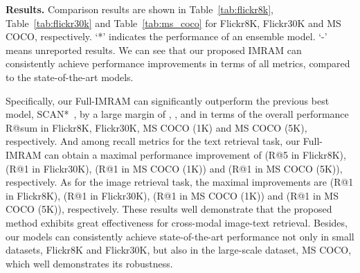 \documentclass[10pt,twocolumn,letterpaper]{article}
\begin{document}
\textbf{Results.} Comparison results are shown in Table~\ref{tab:flickr8k}, Table~\ref{tab:flickr30k} and Table~\ref{tab:ms_coco} for Flickr8K, Flickr30K and MS COCO, respectively. `*' indicates the performance of an ensemble model. `-' means unreported results. We can see that our proposed IMRAM can consistently achieve performance improvements in terms of all metrics, compared to the state-of-the-art models. 

Specifically, our Full-IMRAM can significantly outperform the previous best model, \ie{} SCAN*~\cite{lee2018stacked}, by a large margin of , ,  and  in terms of the overall performance R@sum in Flickr8K, Flickr30K, MS COCO (1K) and MS COCO (5K), respectively. And among recall metrics for the text retrieval task, our Full-IMRAM can obtain a maximal performance improvement of  (R@5 in Flickr8K),  (R@1 in Flickr30K),  (R@1 in MS COCO (1K)) and  (R@1 in MS COCO (5K)), respectively. As for the image retrieval task, the maximal improvements are  (R@1 in Flickr8K),  (R@1 in Flickr30K),  (R@1 in MS COCO (1K)) and  (R@1 in MS COCO (5K)), respectively. These results well demonstrate that the proposed method exhibits great effectiveness for cross-modal image-text retrieval. Besides, our models can consistently achieve state-of-the-art performance not only in small datasets, \ie{} Flickr8K and Flickr30K, but also in the large-scale dataset, \ie{} MS COCO, which well demonstrates its robustness.


\begin{table}
\centering
\caption{The effect of the total steps of matching, , on variants of IMRAM in MS COCO (5K). }\label{tab:matching_steps_coco}
\end{table}
\end{document}
